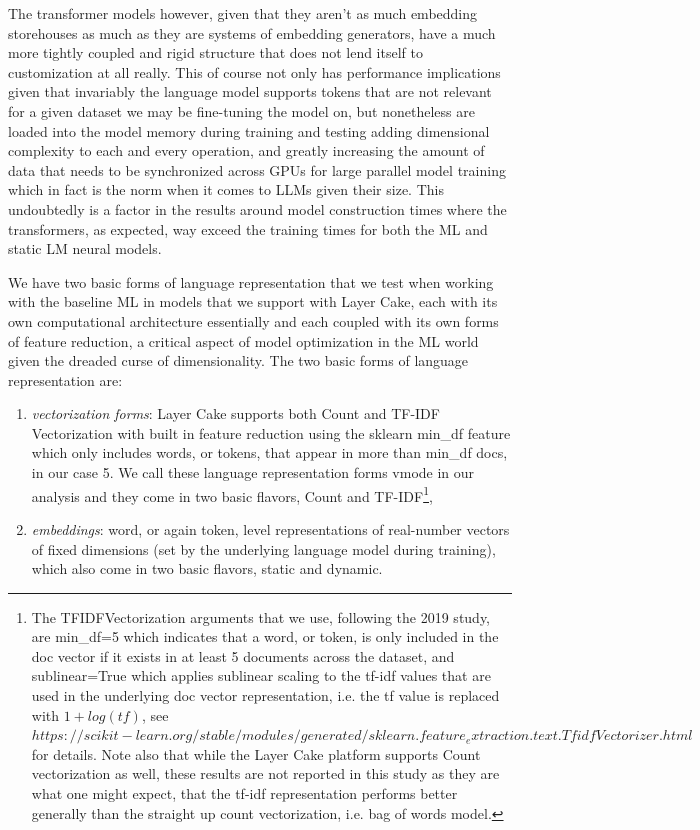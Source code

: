 \documentclass[final]{clv2025-revised}
\begin{document}
The transformer models however, given that they aren’t as much embedding storehouses as much as they are systems of embedding generators, have a much more tightly coupled and rigid structure that does not lend itself to customization at all really. This of course not only has performance implications given that invariably the language model supports tokens that are not relevant for a given dataset we may be fine-tuning the model on, but nonetheless are loaded into the model memory during training and testing adding dimensional complexity to each and every operation, and greatly increasing the amount of data that needs to be synchronized across GPUs for large parallel model training which in fact is the norm when it comes to LLMs given their size. This undoubtedly is a factor in the results around model construction times where the transformers, as expected, way exceed the training times for both the ML and static LM neural models.

We have two basic forms of language representation that we test when working with the baseline ML in models that we support with Layer Cake, each with its own computational architecture essentially and each coupled with its own forms of feature reduction, a critical aspect of model optimization in the ML world given the dreaded curse of dimensionality.  The two basic forms of language representation are:

\begin{enumerate}
	\setlength\itemsep{2pt}
    \item \textit{vectorization forms}: Layer Cake supports both Count and TF-IDF Vectorization with built in feature reduction using the sklearn min\_df feature which only includes words, or tokens, that appear in more than min\_df docs, in our case 5. We call these language representation forms vmode in our analysis and they come in two basic flavors, Count and TF-IDF\footnote{The TFIDFVectorization arguments that we use, following the 2019 study, are min\_df=5 which indicates that a word, or token, is only included in the doc vector if it exists in at least 5 documents across the dataset, and sublinear=True which applies sublinear scaling to the tf-idf values that are used in the underlying doc vector representation, i.e. the tf value is replaced with $1+log(tf)$, see $https://scikit-learn.org/stable/modules/generated/sklearn.feature_extraction.text.TfidfVectorizer.html$ for details. Note also that while the Layer Cake platform supports Count vectorization as well, these results are not reported in this study as they are what one might expect, that the tf-idf representation performs better generally than the straight up count vectorization, i.e. bag of words model.}, 
    \item \textit{embeddings}: word, or again token, level representations of real-number vectors of fixed dimensions (set by the underlying language model during training), which also come in two basic flavors, static and dynamic. 
\end{enumerate}
\end{document}

